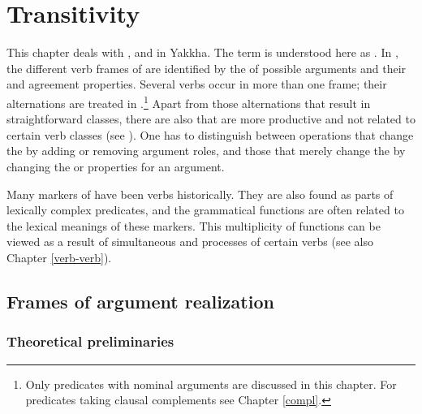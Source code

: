﻿%

\chapter{Transitivity}\label{verb-val}

This chapter deals with ,  and  in Yakkha. The term  is understood here as  \citep[1130]{Haspelmath2004_Valency}. In , the  different verb frames of  are identified by the  of possible arguments and their  and agreement properties. Several verbs occur in more than one frame; their alternations are treated in .\footnote{Only predicates with nominal arguments are discussed in this chapter. For predicates taking clausal complements see Chapter \ref{compl}.} Apart from those alternations that result in straightforward classes, there are also  that are more productive and not related to certain verb classes (see ). One has to distinguish between operations that change the  by adding or removing argument roles, and those that merely change the  by changing the  or  properties for an argument. 

Many markers of  have been verbs historically. They are also found as parts of lexically complex predicates, and the grammatical functions are often related to the lexical meanings of these markers. This multiplicity of functions can be viewed as a result of simultaneous  and  processes of certain verbs (see also Chapter \ref{verb-verb}). 

\section{Frames of argument realization}\label{frames}

\subsection{Theoretical preliminaries}

